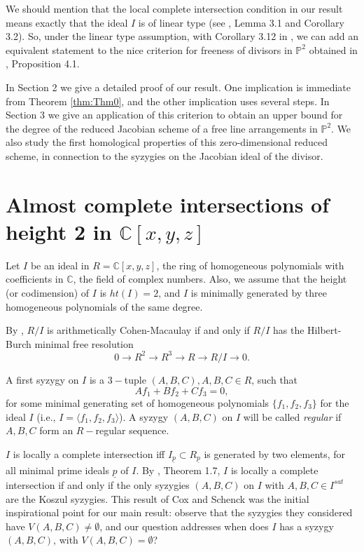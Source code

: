 \documentclass[12pt]{amsart}
\begin{document}
We should mention that the local complete intersection condition in our result means exactly that the ideal $I$ is of linear type (see \cite{AA}, Lemma 3.1 and Corollary 3.2). So, under the linear type assumption, with Corollary 3.12 in \cite{sim1}, we can add an equivalent statement to the nice criterion for freeness of divisors in $\mathbb P^2$ obtained in \cite{sim1}, Proposition 4.1.

In Section 2 we give a detailed proof of our result. One implication is immediate from Theorem \ref{thm:Thm0}, and the other implication uses several steps. In Section 3 we give an application of this criterion to obtain an upper bound for the degree of the reduced Jacobian scheme of a free line arrangements in $\mathbb P^2$. We also study the first homological properties of this zero-dimensional reduced scheme, in connection to the syzygies on the Jacobian ideal of the divisor.

\section{Almost complete intersections of height 2 in $\mathbb C[x,y,z]$}

Let $I$ be an ideal in $R=\mathbb C[x,y,z]$, the ring of homogeneous polynomials with coefficients in $\mathbb C$, the field of complex numbers. Also, we assume that the height (or codimension) of $I$ is $ht(I)=2$, and $I$ is minimally generated by three homogeneous polynomials of the same degree.

By \cite{e}, $R/I$ is arithmetically Cohen-Macaulay if and only if $R/I$ has the Hilbert-Burch minimal free resolution $$0\rightarrow R^2\rightarrow R^3\rightarrow R\rightarrow R/I\rightarrow 0.$$

A first syzygy on $I$ is a $3-$tuple $(A,B,C), A,B,C\in R$, such that $$Af_1+Bf_2+Cf_3=0,$$ for some minimal generating set of homogeneous polynomials $\{f_1,f_2,f_3\}$ for the ideal $I$ (i.e., $I=\langle f_1,f_2,f_3\rangle$). A syzygy $(A,B,C)$ on $I$ will be called \textit{regular} if $A,B,C$ form an $R-$regular sequence.

$I$ is locally a complete intersection iff $I_{\underline{p}}\subset R_{\underline{p}}$ is generated by two elements, for all minimal prime ideals $\underline{p}$ of $I$. By \cite{cs}, Theorem 1.7, $I$ is locally a complete intersection if and only if the only syzygies $(A,B,C)$ on $I$ with $A,B,C\in I^{sat}$ are the Koszul syzygies. This result of Cox and Schenck was the initial inspirational point for our main result: observe that the syzygies they considered have $V(A,B,C)\neq \emptyset$, and our question addresses when does $I$ has a syzygy $(A,B,C)$, with $V(A,B,C)=\emptyset$?
\end{document}
